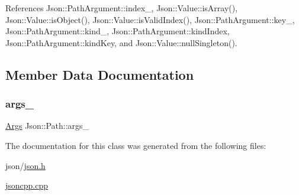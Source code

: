 References Json\+::\+Path\+Argument\+::index\+\_\+, Json\+::\+Value\+::is\+Array(), Json\+::\+Value\+::is\+Object(), Json\+::\+Value\+::is\+Valid\+Index(), Json\+::\+Path\+Argument\+::key\+\_\+, Json\+::\+Path\+Argument\+::kind\+\_\+, Json\+::\+Path\+Argument\+::kind\+Index, Json\+::\+Path\+Argument\+::kind\+Key, and Json\+::\+Value\+::null\+Singleton().



\subsection{Member Data Documentation}
\mbox{\label{classJson_1_1Path_af33d0de7ee9f99d3e361bdf504dc2bc7_af33d0de7ee9f99d3e361bdf504dc2bc7}} 
\subsubsection{\texorpdfstring{args\+\_\+}{args\_}}
{\footnotesize\ttfamily \hyperlink{classJson_1_1Path_a27d96232d034d7a78286468676f9cb3e_a27d96232d034d7a78286468676f9cb3e}{Args} Json\+::\+Path\+::args\+\_\+\hspace{0.3cm}{\ttfamily [private]}}



The documentation for this class was generated from the following files\+:\begin{DoxyCompactItemize}
\item 
json/\hyperlink{json_8h}{json.\+h}\item 
\hyperlink{jsoncpp_8cpp}{jsoncpp.\+cpp}\end{DoxyCompactItemize}
